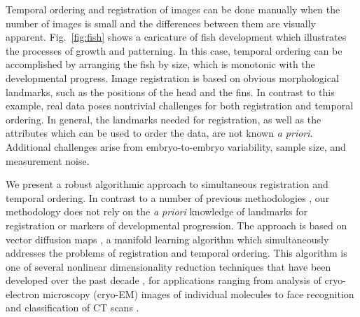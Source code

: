 \documentclass[twocolumn, 10pt]{article}
\newcommand{\fig}[0]{Fig.}
\begin{document}
Temporal ordering and registration of images can be done manually
when the number of images is small and the differences between them are visually apparent.
%
\fig~\ref{fig:fish} shows a caricature of fish development which illustrates the processes of growth and patterning.
%
In this case, temporal ordering can be accomplished by arranging the fish by size, which is monotonic with the developmental progress.
%
Image registration is based on obvious morphological landmarks, such as the positions of the head and the fins.
%
In contrast to this example, real data poses nontrivial challenges for both registration and temporal ordering.
%
In general, the landmarks needed for registration, as well as the attributes which can be used to order the data, are not known {\it a priori}.
%
Additional challenges arise from embryo-to-embryo variability, sample size, and measurement noise.


We present a robust algorithmic approach to simultaneous registration and temporal ordering.
%
In contrast to a number of previous methodologies \citep{zitova2003image, rowley1998rotation, hajnal2010medical, greenspan1994rotation, zhao2003face, dubuis2013accurate}, our methodology does not rely on the {\em a priori} knowledge of landmarks for registration or markers of developmental progression.
%
The approach is based on vector diffusion maps \citep{singer2012vector}, a manifold learning algorithm which simultaneously addresses the problems of registration and temporal ordering.
%
This algorithm is one of several nonlinear dimensionality reduction techniques that have been developed over the past decade \citep{Belkin2003, coifman2005geometric, coifman2006geometric, tenenbaum2000global, roweis2000nonlinear}, for
applications ranging from analysis of cryo-electron microscopy (cryo-EM) images of individual molecules  \citep{zhao2014rotationally, singer2011viewing} to face recognition \citep{lafon2006data} and classification of CT scans \citep{fernandez2014diffusion}.
\end{document}
